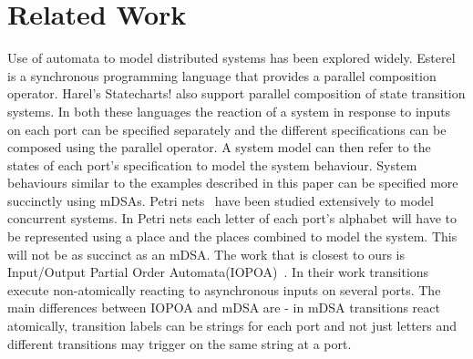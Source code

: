 \section{Related Work}
Use of automata to model distributed systems has been explored widely.
Esterel~\cite{DBLP:journals/scp/BerryG92} is a synchronous programming language
that provides a parallel composition operator. Harel's
Statecharts!\cite{DBLP:journals/scp/Harel87} also support parallel composition
of state transition systems. In both these languages the reaction of a system
in response to inputs on each port can be specified separately and the
different specifications can be composed using the parallel operator. A system
model can then refer to the states of each port's specification to model the
system behaviour. System behaviours similar to the examples described in this
paper can be specified more succinctly using mDSAs. Petri nets~\cite{CAPetri}
have been studied extensively to model concurrent systems. In Petri nets each
letter of each port's alphabet will have to be represented using a place and
the places combined to model the system. This will not be as succinct as an
mDSA. 
The work that is closest to ours is Input/Output Partial Order
Automata(IOPOA)~\cite{10.5555/2391293.2391305}. In their work transitions
execute non-atomically reacting to asynchronous inputs on several ports. The main differences between IOPOA and mDSA are - in mDSA transitions react atomically, transition labels can be strings for each port and not just letters and different transitions may trigger on the same string at a port.
